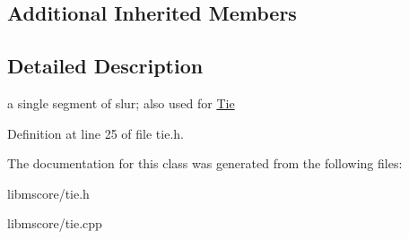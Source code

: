 \subsection*{Additional Inherited Members}


\subsection{Detailed Description}
a single segment of slur; also used for \hyperlink{class_ms_1_1_tie}{Tie} 

Definition at line 25 of file tie.\+h.



The documentation for this class was generated from the following files\+:\begin{DoxyCompactItemize}
\item 
libmscore/tie.\+h\item 
libmscore/tie.\+cpp\end{DoxyCompactItemize}
